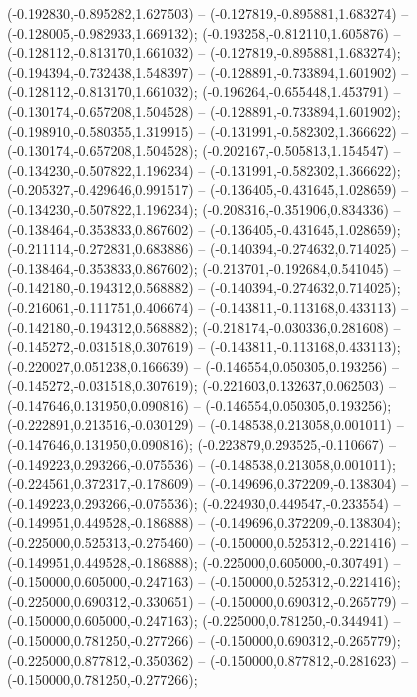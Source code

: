  (-0.192830,-0.895282,1.627503) -- (-0.127819,-0.895881,1.683274) -- (-0.128005,-0.982933,1.669132);
 (-0.193258,-0.812110,1.605876) -- (-0.128112,-0.813170,1.661032) -- (-0.127819,-0.895881,1.683274);
 (-0.194394,-0.732438,1.548397) -- (-0.128891,-0.733894,1.601902) -- (-0.128112,-0.813170,1.661032);
 (-0.196264,-0.655448,1.453791) -- (-0.130174,-0.657208,1.504528) -- (-0.128891,-0.733894,1.601902);
 (-0.198910,-0.580355,1.319915) -- (-0.131991,-0.582302,1.366622) -- (-0.130174,-0.657208,1.504528);
 (-0.202167,-0.505813,1.154547) -- (-0.134230,-0.507822,1.196234) -- (-0.131991,-0.582302,1.366622);
 (-0.205327,-0.429646,0.991517) -- (-0.136405,-0.431645,1.028659) -- (-0.134230,-0.507822,1.196234);
 (-0.208316,-0.351906,0.834336) -- (-0.138464,-0.353833,0.867602) -- (-0.136405,-0.431645,1.028659);
 (-0.211114,-0.272831,0.683886) -- (-0.140394,-0.274632,0.714025) -- (-0.138464,-0.353833,0.867602);
 (-0.213701,-0.192684,0.541045) -- (-0.142180,-0.194312,0.568882) -- (-0.140394,-0.274632,0.714025);
 (-0.216061,-0.111751,0.406674) -- (-0.143811,-0.113168,0.433113) -- (-0.142180,-0.194312,0.568882);
 (-0.218174,-0.030336,0.281608) -- (-0.145272,-0.031518,0.307619) -- (-0.143811,-0.113168,0.433113);
 (-0.220027,0.051238,0.166639) -- (-0.146554,0.050305,0.193256) -- (-0.145272,-0.031518,0.307619);
 (-0.221603,0.132637,0.062503) -- (-0.147646,0.131950,0.090816) -- (-0.146554,0.050305,0.193256);
 (-0.222891,0.213516,-0.030129) -- (-0.148538,0.213058,0.001011) -- (-0.147646,0.131950,0.090816);
 (-0.223879,0.293525,-0.110667) -- (-0.149223,0.293266,-0.075536) -- (-0.148538,0.213058,0.001011);
 (-0.224561,0.372317,-0.178609) -- (-0.149696,0.372209,-0.138304) -- (-0.149223,0.293266,-0.075536);
 (-0.224930,0.449547,-0.233554) -- (-0.149951,0.449528,-0.186888) -- (-0.149696,0.372209,-0.138304);
 (-0.225000,0.525313,-0.275460) -- (-0.150000,0.525312,-0.221416) -- (-0.149951,0.449528,-0.186888);
 (-0.225000,0.605000,-0.307491) -- (-0.150000,0.605000,-0.247163) -- (-0.150000,0.525312,-0.221416);
 (-0.225000,0.690312,-0.330651) -- (-0.150000,0.690312,-0.265779) -- (-0.150000,0.605000,-0.247163);
 (-0.225000,0.781250,-0.344941) -- (-0.150000,0.781250,-0.277266) -- (-0.150000,0.690312,-0.265779);
 (-0.225000,0.877812,-0.350362) -- (-0.150000,0.877812,-0.281623) -- (-0.150000,0.781250,-0.277266);
